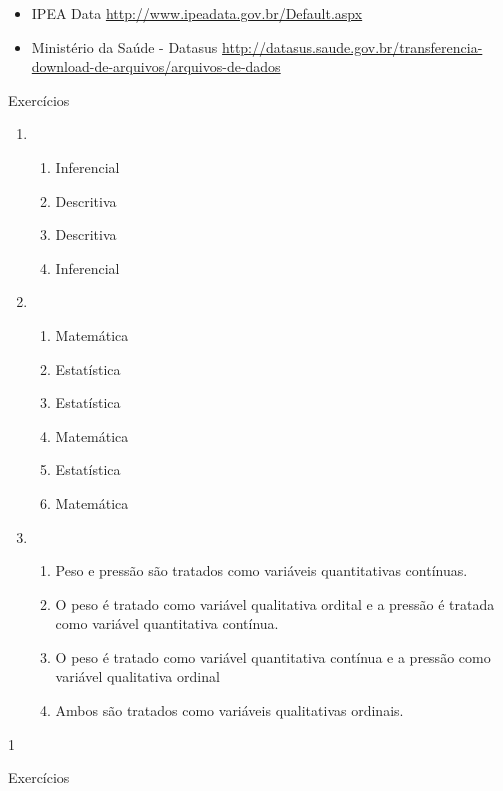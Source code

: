 {\begin{itemize}
\item {} 
IPEA Data \textendash{} \url{http://www.ipeadata.gov.br/Default.aspx}

\item {} 
Ministério da Saúde - Datasus \textendash{} \url{http://datasus.saude.gov.br/transferencia-download-de-arquivos/arquivos-de-dados}

\end{itemize}
\clearpage

\exercise

\begin{answer}{Exercícios}
{\exerciselist
  \begin{enumerate}
  \item 
  \begin{enumerate}
  \item Inferencial
  \item Descritiva
  \item Descritiva
  \item Inferencial
  \end{enumerate}
  \item
  \begin{enumerate}
  \item Matemática
  \item Estatística
  \item Estatística
  \item Matemática
  \item Estatística
  \item Matemática
  \end{enumerate}
  \item 
  \begin{enumerate}
  \item Peso e pressão são tratados como variáveis quantitativas contínuas.
  \item O peso é tratado como variável qualitativa ordital e a pressão é tratada como variável quantitativa contínua.
  \item O peso é tratado como variável quantitativa contínua e a pressão como variável qualitativa ordinal
  \item Ambos são tratados como variáveis qualitativas ordinais.
  \end{enumerate}
  \end{enumerate}
}{1}
\end{answer}
\clearmargin
\begin{answer}{Exercícios}
{\exerciselist
  \begin{enumerate}\setcounter{enumi}{3}

\end{enumerate}}
\end{answer}}
